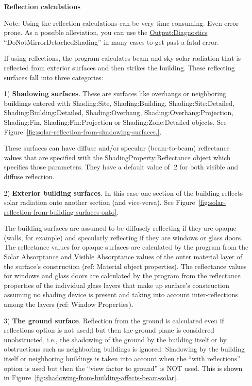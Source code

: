 \textbf{Reflection calculations}

Note: Using the reflection calculations can be very time-consuming. Even error-prone. As a possible alleviation, you can use the \hyperref[outputdiagnostics]{Output:Diagnostics} ``DoNotMirrorDetachedShading'' in many cases to get past a fatal error.

If using reflections, the program calculates beam and sky solar radiation that is reflected from exterior surfaces and then strikes the building. These reflecting surfaces fall into three categories:

1) \textbf{Shadowing surfaces}. These are surfaces like overhangs or neighboring buildings entered with Shad\-ing:\-Site, Shad\-ing:\-Build\-ing, Shad\-ing:\-Site:\-Detailed, Shad\-ing:\-Build\-ing:\-Detailed, Shad\-ing:\-Over\-hang, Shad\-ing:\-Over\-hang:Pro\-jection, Shad\-ing:\-Fin, Shad\-ing:\-Fin:\-Pro\-jection or Shad\-ing:\-Zone:\-Detailed objects. See Figure~\ref{fig:solar-reflection-from-shadowing-surfaces.}.

These surfaces can have diffuse and/or specular (beam-to-beam) reflectance values that are specified with the Shad\-ing\-Property:\-Re\-flectance object which specifies those parameters. They have a default value of .2 for both visible and diffuse reflection.

2) \textbf{Exterior building surfaces}. In this case one section of the building reflects solar radiation onto another section (and vice-versa). See Figure~\ref{fig:solar-reflection-from-building-surfaces-onto}.

The building surfaces are assumed to be diffusely reflecting if they are opaque (walls, for example) and specularly reflecting if they are windows or glass doors. The reflectance values for opaque surfaces are calculated by the program from the Solar Absorptance and Visible Absorptance values of the outer material layer of the surface's construction (ref: Material object properties). The reflectance values for windows and glass doors are calculated by the program from the reflectance properties of the individual glass layers that make up surface's construction assuming no shading device is present and taking into account inter-reflections among the layers (ref: Window Properties).

3) \textbf{The ground surface}. Reflection from the ground is calculated even if reflections option is not used;l but then the ground plane is considered unobstructed, i.e., the shadowing of the ground by the building itself or by obstructions such as neighboring buildings is ignored. Shadowing by the building itself or neighboring buildings is taken into account when the ``with reflections'' option is used but then the ``view factor to ground'' is NOT used. This is shown in Figure~\ref{fig:shadowing-from-building-affects-beam-solar}.

